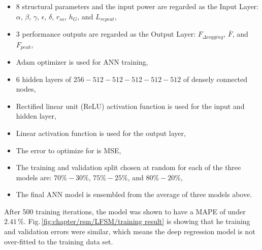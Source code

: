             
            \begin{itemize}
                \item $8$ structural parameters and the input power are regarded as the Input Layer: $\alpha$, $\beta$, $\gamma$, $\epsilon$, $\delta$, $r_{so}$, $h_G$, and $L_{repeat}$,
                \item $3$ performance outputs are regarded as the Output Layer: $F_{\Delta cogging}$, $\overline{F}$, and $F_{peak}$,
                \item $\mathrm{Adam}$ optimizer is used for ANN training,
                \item $6$ hidden layers of $256-512-512-512-512-512$ of densely connected nodes,
                \item Rectified linear unit (ReLU) activation function is used
for the input and hidden layer,
                \item Linear activation function is used for the output layer,
                \item The error to optimize for is \acs{MSE},
                \item The training and validation split chosen at random for each of the three models are: $70\%-30\%$, $75\%-25\%$, and $80\%-20\%$,
                \item The final \acs{ANN} model is ensembled from the average of three models above.
            \end{itemize}


            After 500 training iterations, the model was shown to have a \acf{MAPE} of under $2.41\,\%$. Fig.\,\ref{fig:chapter/rsm/LFSM/training result} is showing that he training and validation errors were similar, which means the deep regression model is not over-fitted to the training data set.
            
